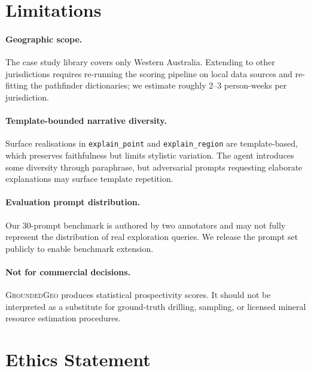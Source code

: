 \documentclass[11pt]{article}
\begin{document}
\section*{Limitations}


\paragraph{Geographic scope.}
The case study library covers only Western Australia. Extending to
other jurisdictions requires re-running the scoring pipeline on local
data sources and re-fitting the pathfinder dictionaries; we estimate
roughly 2--3 person-weeks per jurisdiction.

\paragraph{Template-bounded narrative diversity.}
Surface realisations in \texttt{explain\_point} and
\texttt{explain\_region} are template-based, which preserves
faithfulness but limits stylistic variation. The agent introduces
some diversity through paraphrase, but adversarial prompts requesting
elaborate explanations may surface template repetition.

\paragraph{Evaluation prompt distribution.}
Our 30-prompt benchmark is authored by two annotators and may not
fully represent the distribution of real exploration queries. We
release the prompt set publicly to enable benchmark extension.

\paragraph{Not for commercial decisions.}
\textsc{GroundedGeo} produces statistical prospectivity scores. It
should not be interpreted as a substitute for ground-truth drilling,
sampling, or licensed mineral resource estimation procedures.

\section*{Ethics Statement}
\end{document}
